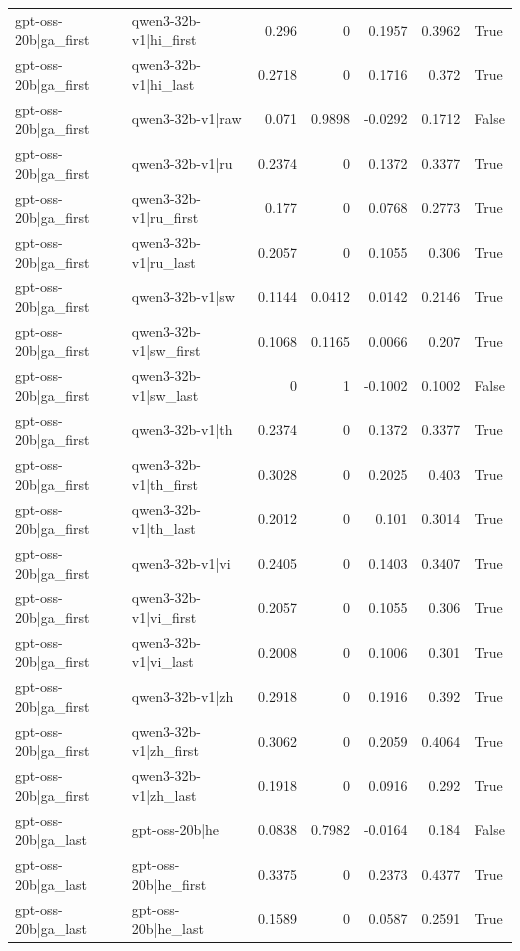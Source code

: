 \begin{table}
\begin{tabular}{l l r r r r l}
gpt-oss-20b|ga_first & qwen3-32b-v1|hi_first & 0.296 & 0 & 0.1957 & 0.3962 & True \\
gpt-oss-20b|ga_first & qwen3-32b-v1|hi_last & 0.2718 & 0 & 0.1716 & 0.372 & True \\
gpt-oss-20b|ga_first & qwen3-32b-v1|raw & 0.071 & 0.9898 & -0.0292 & 0.1712 & False \\
gpt-oss-20b|ga_first & qwen3-32b-v1|ru & 0.2374 & 0 & 0.1372 & 0.3377 & True \\
gpt-oss-20b|ga_first & qwen3-32b-v1|ru_first & 0.177 & 0 & 0.0768 & 0.2773 & True \\
gpt-oss-20b|ga_first & qwen3-32b-v1|ru_last & 0.2057 & 0 & 0.1055 & 0.306 & True \\
gpt-oss-20b|ga_first & qwen3-32b-v1|sw & 0.1144 & 0.0412 & 0.0142 & 0.2146 & True \\
gpt-oss-20b|ga_first & qwen3-32b-v1|sw_first & 0.1068 & 0.1165 & 0.0066 & 0.207 & True \\
gpt-oss-20b|ga_first & qwen3-32b-v1|sw_last & 0 & 1 & -0.1002 & 0.1002 & False \\
gpt-oss-20b|ga_first & qwen3-32b-v1|th & 0.2374 & 0 & 0.1372 & 0.3377 & True \\
gpt-oss-20b|ga_first & qwen3-32b-v1|th_first & 0.3028 & 0 & 0.2025 & 0.403 & True \\
gpt-oss-20b|ga_first & qwen3-32b-v1|th_last & 0.2012 & 0 & 0.101 & 0.3014 & True \\
gpt-oss-20b|ga_first & qwen3-32b-v1|vi & 0.2405 & 0 & 0.1403 & 0.3407 & True \\
gpt-oss-20b|ga_first & qwen3-32b-v1|vi_first & 0.2057 & 0 & 0.1055 & 0.306 & True \\
gpt-oss-20b|ga_first & qwen3-32b-v1|vi_last & 0.2008 & 0 & 0.1006 & 0.301 & True \\
gpt-oss-20b|ga_first & qwen3-32b-v1|zh & 0.2918 & 0 & 0.1916 & 0.392 & True \\
gpt-oss-20b|ga_first & qwen3-32b-v1|zh_first & 0.3062 & 0 & 0.2059 & 0.4064 & True \\
gpt-oss-20b|ga_first & qwen3-32b-v1|zh_last & 0.1918 & 0 & 0.0916 & 0.292 & True \\
gpt-oss-20b|ga_last & gpt-oss-20b|he & 0.0838 & 0.7982 & -0.0164 & 0.184 & False \\
gpt-oss-20b|ga_last & gpt-oss-20b|he_first & 0.3375 & 0 & 0.2373 & 0.4377 & True \\
gpt-oss-20b|ga_last & gpt-oss-20b|he_last & 0.1589 & 0 & 0.0587 & 0.2591 & True \\

\end{tabular}
\end{table}

